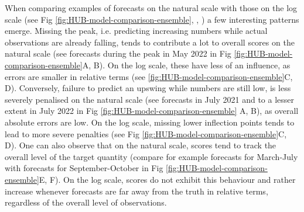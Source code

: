 \documentclass[10pt,letterpaper]{article}
\begin{document}
When comparing examples of forecasts on the natural scale with those on the log scale (see Fig \ref{fig:HUB-model-comparison-ensemble}, , ) a few interesting patterns emerge. Missing the peak, i.e. predicting increasing numbers while actual observations are already falling, tends to contribute a lot to overall scores on the natural scale (see forecasts during the peak in May 2022 in Fig \ref{fig:HUB-model-comparison-ensemble}A, B). On the log scale, these have less of an influence, as errors are smaller in relative terms (see \ref{fig:HUB-model-comparison-ensemble}C, D). Conversely, failure to predict an upswing while numbers are still low, is less severely penalised on the natural scale (see forecasts in July 2021 and to a lesser extent in July 2022 in Fig \ref{fig:HUB-model-comparison-ensemble} A, B), as overall absolute errors are low. On the log scale, missing lower inflection points tends to lead to more severe penalties (see Fig \ref{fig:HUB-model-comparison-ensemble}C, D). One can also observe that on the natural scale, scores tend to track the overall level of the target quantity (compare for example forecasts for March-July with forecasts for September-October in Fig \ref{fig:HUB-model-comparison-ensemble}E, F). On the log scale, scores do not exhibit this behaviour and rather increase whenever forecasts are far away from the truth in relative terms, regardless of the overall level of observations. 
\end{document}
